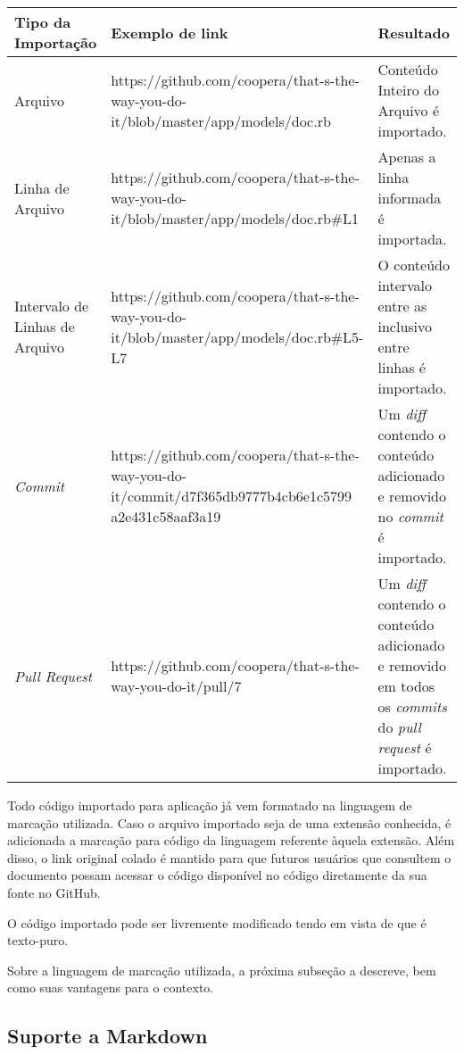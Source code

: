 \begin{center}
    \begin{tabular}{| p{3cm} | p{7cm} | p{5cm} |}
    \hline
    Tipo da Importação & Exemplo de link & Resultado \\ \hline
    Arquivo & https://github.com/coopera/that-s-the-way-you-do-it/blob/master/app/models/doc.rb & Conteúdo Inteiro do Arquivo é importado. \\ \hline
    Linha de Arquivo & https://github.com/coopera/that-s-the-way-you-do-it/blob/master/app/models/doc.rb\#L1 & Apenas a linha informada é importada. \\ \hline
    Intervalo de Linhas de Arquivo & https://github.com/coopera/that-s-the-way-you-do-it/blob/master/app/models/doc.rb\#L5-L7 & O conteúdo intervalo entre as inclusivo entre linhas é importado. \\ \hline
    \textit{Commit} & https://github.com/coopera/that-s-the-way-you-do-it/commit/d7f365db9777b4cb6e1c5799 a2e431c58aaf3a19 & Um \textit{diff} contendo o conteúdo adicionado e removido no \textit{commit} é importado. \\ \hline
    \textit{Pull Request} & https://github.com/coopera/that-s-the-way-you-do-it/pull/7 & Um \textit{diff} contendo o conteúdo adicionado e removido em todos os \textit{commits} do \textit{pull request} é importado.  \\ \hline
    \end{tabular}
\end{center}


Todo código importado para aplicação já vem formatado na linguagem de marcação utilizada. Caso o arquivo importado seja de uma extensão conhecida, é adicionada a marcação para código da linguagem referente àquela extensão. Além disso, o link original colado é mantido para que futuros usuários que consultem o documento possam acessar o código disponível no código diretamente da sua fonte no GitHub.

O código importado pode ser livremente modificado tendo em vista de que é texto-puro.


Sobre a linguagem de marcação utilizada, a próxima subseção a descreve, bem como suas vantagens para o contexto.

\subsection{Suporte a Markdown}

